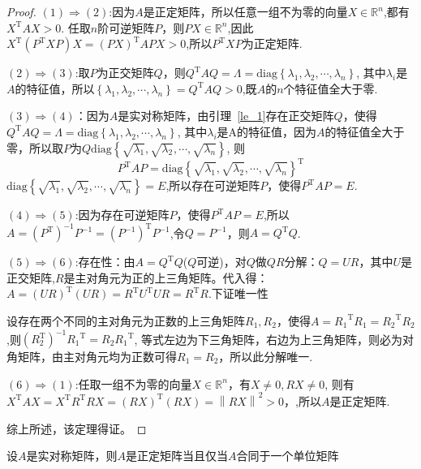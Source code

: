 \begin{proof}
    $(1)\Rightarrow(2)$:因为$A$是正定矩阵，所以任意一组不为零的向量$X\in \mathbb{R}^n$,都有$X^\mathrm{T}AX>0$.
    任取$n$阶可逆矩阵$P$，则$PX\in \mathbb{R}^{n}$,因此$X^\mathrm{T}(P^\mathrm{T}XP)X=(PX)^\mathrm{T}APX>0$,所以$P^\mathrm{T}XP$为正定矩阵.

    $(2)\Rightarrow(3)$:取$P$为正交矩阵$Q$，则$Q^\mathrm{T}AQ=\Lambda=\mathrm{diag}\left\{\lambda_1,\lambda_2,\cdots,\lambda_n\right\}$,
    其中$\lambda_i$是$A$的特征值，所以$\left\{{\lambda_1,\lambda_2,\cdots,\lambda_n}\right\}=Q^\mathrm{T}AQ>0$,既$A$的$n$个特征值全大于零.

    $(3)\Rightarrow(4)$：因为$A$是实对称矩阵，由引理~\ref{le_1}存在正交矩阵$Q$，使得$Q^\mathrm{T}AQ=\Lambda=\mathrm{diag}\left\{ \lambda_1,\lambda_2,\cdots,\lambda_n\right\}$,
    其中$\lambda_i$是A的特征值，因为$A$的特征值全大于零，所以取$P$为$Q\mathrm{diag}\left\{ \sqrt{\lambda_1},\sqrt{\lambda_2},\cdots,\sqrt{\lambda_n} \right\}$,
    则$$P^\mathrm{T}AP=\mathrm{diag}\left\{ \sqrt{\lambda_1},\sqrt{\lambda_2},\cdots,\sqrt{\lambda_n} \right\}^\mathrm{T}$$
    $\mathrm{diag}\left\{ \sqrt{\lambda_1},\sqrt{\lambda_2},\cdots,\sqrt{\lambda_n} \right\}=E$,所以存在可逆矩阵$P$，使得$P^\mathrm{T}AP=E$.

    $(4)\Rightarrow(5)$:因为存在可逆矩阵$P$，使得$P^\mathrm{T}AP=E$,所以$A=(P^\mathrm{T})^{-1}P^{-1}=(P^{-1})^\mathrm{T}P^{-1}$,令$Q=P^{-1}$，则$A=Q^\mathrm{T}Q$.

    $(5)\Rightarrow(6)$:存在性：由$A=Q^\mathrm{T}Q$($Q$可逆)，对$Q$做$QR$分解：$Q=UR$，其中$U$是正交矩阵,$R$是主对角元为正的上三角矩阵。代入得：
    $A=(UR)^\mathrm{T}(UR)=R^\mathrm{T}U^\mathrm{T}UR=R^\mathrm{T}R$.下证唯一性

    设存在两个不同的主对角元为正数的上三角矩阵$R_1,R_2$，使得$A={R_1}^\mathrm{T}{R_1}={R_2}^\mathrm{T}{R_2}$,则$(R_2^\mathrm{T})^{-1}{R_1}^\mathrm{T}={R_2}{R_1}^\mathrm{T}$,
    等式左边为下三角矩阵，右边为上三角矩阵，则必为对角矩阵，由主对角元均为正数可得${R_1}={R_2}$，所以此分解唯一.

    $(6)\Rightarrow(1)$:任取一组不为零的向量$X\in \mathbb{R}^{n}$，有$X\neq 0,RX\neq 0$,
    则有$X^\mathrm{T}AX=X^\mathrm{T}R^\mathrm{T}RX=(RX)^\mathrm{T}(RX)=\left\| RX\right\|^2>0$，,所以$A$是正定矩阵.

    综上所述，该定理得证。
\end{proof}
\begin{corollary}\label{cor:1}
    设$A$是实对称矩阵，则$A$是正定矩阵当且仅当$A$合同于一个单位矩阵
\end{corollary}
